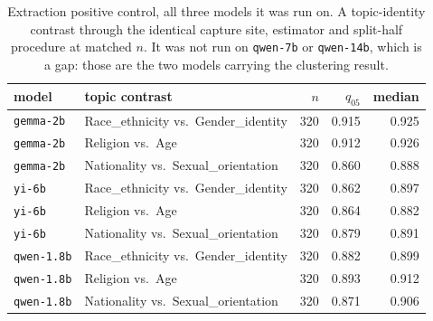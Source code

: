 \begin{table}[h]
\centering
\caption{Extraction positive control, all three models it was run on. A topic-identity contrast through the identical capture site, estimator and split-half procedure at matched $n$. It was not run on \texttt{qwen-7b} or \texttt{qwen-14b}, which is a gap: those are the two models carrying the clustering result.}
\label{tab:control-full}
\begin{tabular}{llrrr}
\toprule
model & topic contrast & $n$ & $q_{05}$ & median \\
\midrule
\texttt{gemma-2b} & Race\_ethnicity vs.\ Gender\_identity & 320 & 0.915 & 0.925 \\
\texttt{gemma-2b} & Religion vs.\ Age & 320 & 0.912 & 0.926 \\
\texttt{gemma-2b} & Nationality vs.\ Sexual\_orientation & 320 & 0.860 & 0.888 \\
\texttt{yi-6b} & Race\_ethnicity vs.\ Gender\_identity & 320 & 0.862 & 0.897 \\
\texttt{yi-6b} & Religion vs.\ Age & 320 & 0.864 & 0.882 \\
\texttt{yi-6b} & Nationality vs.\ Sexual\_orientation & 320 & 0.879 & 0.891 \\
\texttt{qwen-1.8b} & Race\_ethnicity vs.\ Gender\_identity & 320 & 0.882 & 0.899 \\
\texttt{qwen-1.8b} & Religion vs.\ Age & 320 & 0.893 & 0.912 \\
\texttt{qwen-1.8b} & Nationality vs.\ Sexual\_orientation & 320 & 0.871 & 0.906 \\
\bottomrule
\end{tabular}
\end{table}

